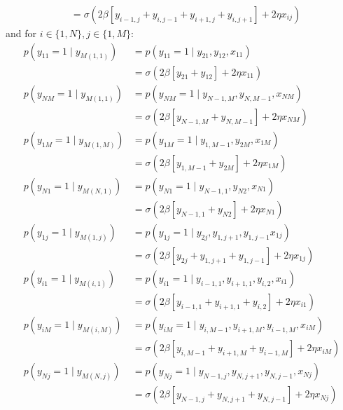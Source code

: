 \documentclass[12pt]{article}
\begin{document}
\begin{enumerate}[label=(\alph*)]
\begin{align*}
	&= \sigma(2\beta[y_{i-1,j} + y_{i, j-1} + y_{i+1,j}+y_{i,j+1}] + 2\eta x_{ij})
\end{align*}
and for $i \in \{1,N\}, j \in \{1, M\}$:
\begin{align*}
	p(y_{11} = 1 \mid y_{M(1,1)}) &= p(y_{11} = 1 \mid y_{21}, y_{12}, x_{11}) \\
	&= \sigma(2\beta[y_{21}+y_{12}] + 2\eta x_{11}) \\
	p(y_{NM} = 1 \mid y_{M(1,1)}) &= p(y_{NM} = 1 \mid y_{N-1, M}, y_{N, M-1}, x_{NM}) \\
	&= \sigma(2\beta[y_{N-1, M}+y_{N, M-1}] + 2\eta x_{NM}) \\
	p(y_{1M} = 1 \mid y_{M(1,M)}) &= p(y_{1M} = 1 \mid y_{1, M-1}, y_{2M}, x_{1M}) \\
	&= \sigma(2\beta[y_{1, M-1} + y_{2M}] + 2\eta x_{1M}) \\
	p(y_{N1} = 1 \mid y_{M(N,1)}) &= p(y_{N1} = 1 \mid y_{N-1, 1}, y_{N2}, x_{N1}) \\
	&= \sigma(2\beta[y_{N-1,1} +y_{N2}] + 2\eta x_{N1}) \\
	p(y_{1j} = 1 \mid y_{M(1,j)}) &= p(y_{1j} = 1 \mid y_{2j}, y_{1,j+1}, y_{1, j-1} x_{1j}) \\
	&= \sigma(2\beta[y_{2j}+y_{1,j+1} + y_{1, j-1}] + 2\eta x_{1j}) \tag{$j \neq 1,M$} \\
	p(y_{i1} = 1 \mid y_{M(i,1)}) &= p(y_{i1} = 1 \mid y_{i-1, 1}, y_{i+1, 1}, y_{i, 2}, x_{i1}) \\
	&= \sigma(2\beta[y_{i-1, 1}+y_{i+1, 1} + y_{i,2}] + 2\eta x_{i1} \tag{$i \neq 1, N$}) \\
	p(y_{iM} = 1 \mid y_{M(i,M)}) &= p(y_{iM} = 1 \mid y_{i, M-1}, y_{i+1, M}, y_{i-1, M}, x_{iM}) \\
	&= \sigma(2\beta[y_{i, M-1} + y_{i+1, M} + y_{i-1, M}] + 2\eta x_{iM}) \tag{$i \neq 1, N$} \\
	p(y_{Nj} = 1 \mid y_{M(N,j)}) &= p(y_{Nj} = 1 \mid y_{N-1, j}, y_{N, j+1}, y_{N, j-1}, x_{Nj}) \\
	&= \sigma(2\beta[y_{N-1,j} +y_{N, j+1} + y_{N, j - 1}] + 2\eta x_{Nj}) \tag{$j \neq 1, M$}
\end{align*}


\end{enumerate}
\end{document}

